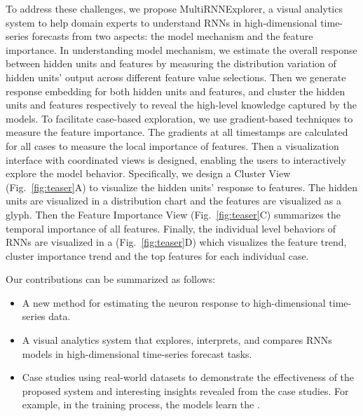 To address these challenges, we propose MultiRNNExplorer, a visual analytics system to help domain experts to understand RNNs in high-dimensional time-series forecasts from two aspects: the model mechanism and the feature importance. In understanding model mechanism, we estimate the overall response between hidden units and features by measuring the distribution variation of hidden units' output across different feature value selections. Then we generate response embedding for both hidden units and features, and cluster the hidden units and features respectively to reveal the high-level knowledge captured by the models. 
To facilitate case-based exploration, we use gradient-based techniques to measure the feature importance.  The gradients at all timestamps are calculated for all cases to measure the local importance of features. 
Then a visualization interface with coordinated views is designed, enabling the users to interactively explore the model behavior. 
Specifically, we design a Cluster View (Fig.~\ref{fig:teaser}A) to visualize the hidden units' response to features. 
The hidden units are visualized in a distribution chart and the features are visualized as a glyph. Then the Feature Importance View (Fig.~\ref{fig:teaser}C) summarizes the temporal importance of all features. Finally, the individual level behaviors of RNNs are visualized in a  (Fig.~\ref{fig:teaser}D) which visualizes the feature trend, cluster importance trend and the top features for each individual case.

Our contributions can be summarized as follows:
\begin{itemize}
  \item A new method for estimating the neuron response to high-dimensional time-series data. 
  \item A visual analytics system that explores, interprets, and compares RNNs models in high-dimensional time-series forecast tasks. 
  \item Case studies using real-world datasets to demonstrate the effectiveness of the proposed system and interesting insights revealed from the case studies. For example, in the training process, the models learn the .
\end{itemize}





